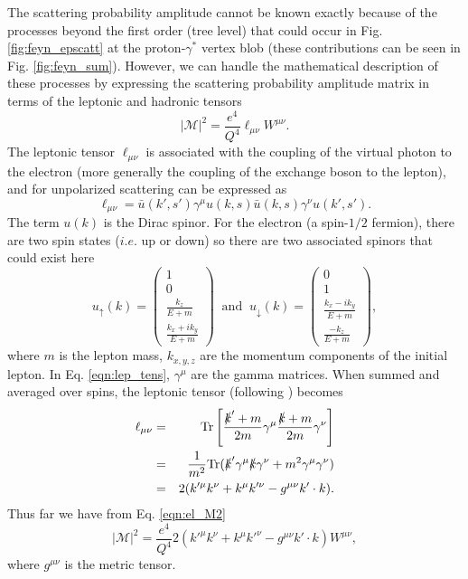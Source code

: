 The scattering probability amplitude cannot be known exactly because of the processes beyond the first order (tree level) that could occur in Fig. \ref{fig:feyn_epscatt} at the proton-$\gamma^{*}$ vertex blob (these contributions can be seen in Fig. \ref{fig:feyn_sum}). However, we can handle the mathematical description of these processes by expressing the scattering probability amplitude matrix in terms of the leptonic and hadronic tensors
\begin{equation}
\label{eqn:el_M2}
|\mathcal{M}|^2 = \frac{e^4}{Q^4} \ell_{\mu\nu} W^{\mu \nu}.
\end{equation}
The leptonic tensor $\ell_{\mu\nu}$ is associated with the coupling of the virtual photon to the electron (more generally the coupling of the exchange boson to the lepton), and for unpolarized scattering can be expressed as
\begin{equation}
\label{eqn:lep_tens}
\ell_{\mu\nu} = \bar{u}(k',s')\gamma^{\mu}u(k,s) \bar{u}(k,s) \gamma^{\nu} u(k',s').
\end{equation}
The term $u(k)$ is the Dirac spinor. For the electron (a spin-$1/2$ fermion), there are two spin states ($i.e.$ up or down) so there are two associated spinors that could exist here
\begin{equation}
u_{\uparrow}(k) = \left( \begin{array}{c} 1 \\ 0 \\ \frac{k_z}{E+m} \\ \frac{k_x+ik_y}{E+m} \end{array} \right) \; \; \mathrm{and} \; \;
u_{\downarrow}(k) = \left( \begin{array}{c} 0 \\ 1 \\ \frac{k_x-ik_y}{E+m} \\ \frac{-k_z}{E+m} \end{array} \right),
\end{equation}
where $m$ is the lepton mass, $k_{x,y,z}$ are the momentum components of the initial lepton. In Eq. \ref{eqn:lep_tens}, $\gamma^{\mu}$ are the gamma matrices. When summed and averaged over spins, the leptonic tensor (following \cite{book:bjorken_drell,}) becomes
\begin{eqnarray}
\nonumber
\ell_{\mu\nu} &=& \mathrm{Tr} \left[ \frac{\slashed{k}'+m}{2m} \gamma^{\mu} \frac{\slashed{k}+m}{2m} \gamma^{\nu} \right] \\
\nonumber
&=& \frac{1}{m^2} \mathrm{Tr} (\slashed{k}'\gamma^{\mu}\slashed{k}\gamma^{\nu} + m^2\gamma^{\mu}\gamma^{\nu}) \\
&=& 2 (k'^{\mu}k^{\nu} + k^{\mu}k'^{\nu} - g^{\mu\nu}k' \cdot k).
\end{eqnarray}
Thus far we have from Eq. \ref{eqn:el_M2}
\begin{equation}
|\mathcal{M}|^2 = \frac{e^4}{Q^4} 2 (k'^{\mu}k^{\nu} + k^{\mu}k'^{\nu} - g^{\mu\nu}k' \cdot k) W^{\mu \nu},
\end{equation}
where $g^{\mu\nu}$ is the metric tensor.

